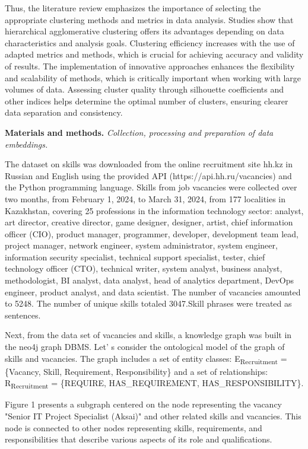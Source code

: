 Thus, the literature review emphasizes the importance of selecting the
appropriate clustering methods and metrics in data analysis. Studies
show that hierarchical agglomerative clustering offers its advantages
depending on data characteristics and analysis goals. Clustering
efficiency increases with the use of adapted metrics and methods, which
is crucial for achieving accuracy and validity of results. The
implementation of innovative approaches enhances the flexibility and
scalability of methods, which is critically important when working with
large volumes of data. Assessing cluster quality through silhouette
coefficients and other indices helps determine the optimal number of
clusters, ensuring clearer data separation and consistency.

{\bfseries Materials and methods.} \emph{Collection, processing and
preparation of data embeddings.}

The dataset on skills was downloaded from the online recruitment site
hh.kz in Russian and English using the provided API
(https://api.hh.ru/vacancies) and the Python programming language.
Skills from job vacancies were collected over two months, from February
1, 2024, to March 31, 2024, from 177 localities in Kazakhstan, covering
25 professions in the information technology sector: analyst, art
director, creative director, game designer, designer, artist, chief
information officer (CIO), product manager, programmer, developer,
development team lead, project manager, network engineer, system
administrator, system engineer, information security specialist,
technical support specialist, tester, chief technology officer (CTO),
technical writer, system analyst, business analyst, methodologist, BI
analyst, data analyst, head of analytics department, DevOps engineer,
product analyst, and data scientist. The number of vacancies amounted to
5248. The number of unique skills totaled 3047.Skill phrases were
treated as sentences.

Next, from the data set of vacancies and skills, a knowledge graph was
built in the neo4j graph DBMS. Let' s consider the
ontological model of the graph of skills and vacancies. The graph
includes a set of entity classes: E\textsubscript{Recruitment} =
\{Vacancy, Skill, Requirement, Responsibility\} and a set of
relationships: R\textsubscript{Recruitment} = \{REQUIRE,
HAS\_REQUIREMENT, HAS\_RESPONSIBILITY\}.

Figure 1 presents a subgraph centered on the node representing the
vacancy "Senior IT Project Specialist (Aksai)" and other related skills
and vacancies. This node is connected to other nodes representing
skills, requirements, and responsibilities that describe various aspects
of its role and qualifications.

